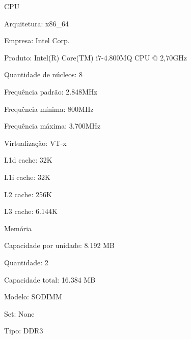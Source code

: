 \begin{alineas}

  \item CPU

  \begin{alineas}

     \item Arquitetura: x86\_64

     \item Empresa: Intel Corp.

     \item Produto: Intel(R) Core(TM) i7-4.800MQ CPU @ 2,70GHz

     \item Quantidade de núcleos: 8

     \item Frequência padrão: 2.848MHz

     \item Frequência mínima:  800MHz

     \item Frequência máxima: 3.700MHz

     \item Virtualização: VT-x

     \item L1d cache: 32K

     \item L1i cache: 32K

     \item L2 cache: 256K

     \item L3 cache: 6.144K

  \end{alineas}

  \item Memória

  \begin{alineas}

     \item Capacidade por unidade: 8.192 MB

     \item Quantidade: 2

     \item Capacidade total: 16.384 MB

     \item Modelo: SODIMM

     \item Set: None

     \item Tipo: DDR3


\end{alineas}
\end{alineas}
